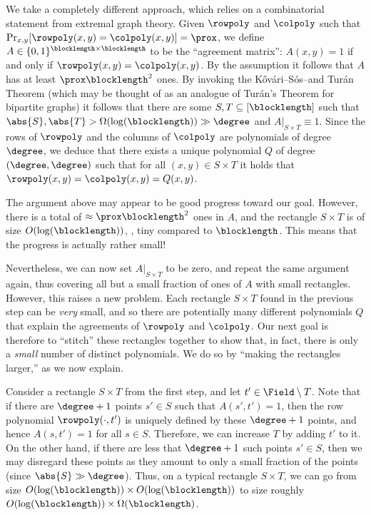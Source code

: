 \documentclass{toc}
\theoremstyle{plain}
\begin{document}
We take a completely different approach, which relies on a combinatorial statement from extremal graph theory. Given $\rowpoly$ and $\colpoly$ such that $\Pr_{x,y}[\rowpoly(x,y) = \colpoly(x,y)] = \prox$, we define $A \in \{0,1\}^{\blocklength \times \blocklength}$ to be the ``agreement matrix'': $A(x,y) = 1$ if and only if $\rowpoly(x,y) = \colpoly(x,y)$. By the assumption it follows that $A$ has at least $\prox \blocklength^2$ ones. By invoking the
%
K\H{o}v\'{a}ri--S\'{o}s--and Tur\'{a}n
Theorem (which may be thought of as an analogue of Tur\'{a}n's Theorem for bipartite graphs) it follows that there are some $S,T \subseteq [\blocklength]$ such that $\abs{S} , \abs{T} > \Omega(\log(\blocklength)) \gg \degree$ and $A\vert_{S \times T} \equiv 1$. Since the rows of $\rowpoly$ and the columns of $\colpoly$ are polynomials of degree $\degree$, we deduce that there exists a unique polynomial $Q$ of degree $(\degree,\degree)$ such that for all $(x,y) \in S \times T$ it holds that $\rowpoly(x,y) = \colpoly(x,y) = Q(x,y)$.

The argument above may appear to be good progress toward our goal. However, there is a total of $\approx \prox \blocklength^2$ ones in $A$, and the rectangle $S \times T$ is of size $O(\log(\blocklength))$, \ie, tiny compared to $\blocklength$. This means that the progress is actually rather small!

Nevertheless, we can now set $A\vert_{S \times T}$ to be zero, and repeat the same argument again, thus covering all but a small fraction of ones of $A$ with small rectangles. However, this raises a new problem. Each rectangle $S \times T$ found in the previous step can be \emph{very} small, and so there are potentially many different polynomials $Q$ that explain the agreements of $\rowpoly$ and $\colpoly$. Our next goal is therefore to ``stitch'' these rectangles together to show that, in fact, there is only a \emph{small} number of distinct polynomials. We do so by ``making the rectangles larger,'' as we now explain.

Consider a rectangle $S \times T$ from the first step, and let $t' \in \Field \setminus T$. Note that if there are $\degree+1$ points $s' \in S$ such that $A(s',t') =1$, then the row polynomial $\rowpoly( \cdot, t')$ is uniquely defined by these $\degree+1$ points, and hence $A(s,t') = 1$ for all $s \in S$. Therefore, we can increase $T$ by adding $t'$ to it. On the other hand, if there are less that $\degree+1$ such points $s'\in S$, then we may disregard these points as they amount to only a small fraction of the points (since $\abs{S} \gg \degree$). Thus, on a typical rectangle $S \times T$, we can go from size $O(\log(\blocklength)) \times O(\log(\blocklength)) $ to size roughly $O(\log(\blocklength)) \times \Omega(\blocklength)$.
\end{document}
